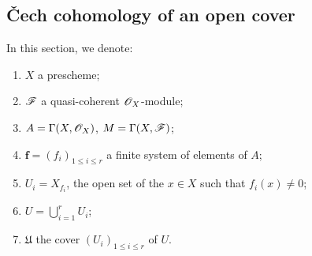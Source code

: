 \subsection{\v Cech cohomology of an open cover}
\label{subsection:III.1.2}

\begin{notation}[1.2.1]
\label{III.1.2.1}
In this section, we denote:
\begin{enumerate}
  \item $X$ a prescheme;
  \item $\mathscr{F}$ a quasi-coherent $\mathscr{O}_X$-module;
  \item $A=\Gamma(X,\mathscr{O}_X)$, $M=\Gamma(X,\mathscr{F})$;
  \item $\mathbf{f}=(f_i)_{1\leq i\leq r}$ a finite system of elements of $A$;
  \item $U_i=X_{f_i}$, the open set  of the $x\in X$ such that $f_i(x)\neq 0$;
  \item $U=\bigcup_{i=1}^r U_i$;
  \item $\mathfrak{U}$ the cover $(U_i)_{1\leq i\leq r}$ of $U$.
\end{enumerate}
\end{notation}

